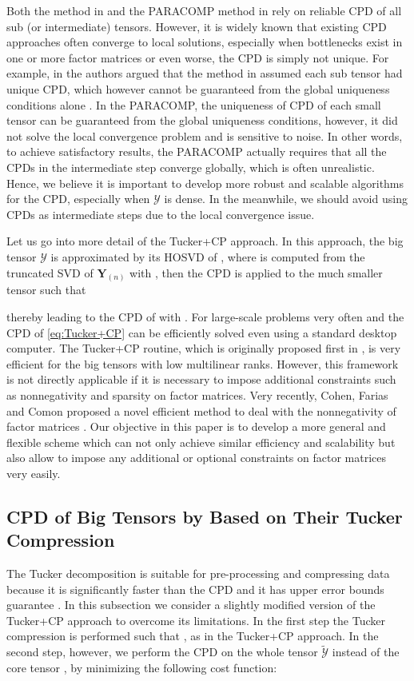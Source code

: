 \documentclass[10pt,twocolumn,twoside]{IEEEtran}
\newcommand{\tensor}[1]{\ensuremath{\boldsymbol{\mathscr{#1}}}}
\newcommand{\tenmat}[2][n]{\ensuremath{{\mathbf{#2}}_{(#1)}}}
\begin{document}
Both the method in \cite{gridPARAFAC} and the PARACOMP method in \cite{spm2014_paracomp} rely on reliable CPD of all sub (or intermediate) tensors. However, it is widely known that existing CPD approaches often converge to local solutions, especially when bottlenecks exist in one or more factor matrices \cite{PComon2009} or even worse,  the CPD is simply not unique.  For example, in \cite{spm2014_paracomp} the authors argued that the method in  \cite{gridPARAFAC} assumed each sub tensor had unique CPD, which however cannot be guaranteed from the global uniqueness conditions alone \cite{spm2014_paracomp}. In the PARACOMP,  the uniqueness of CPD of each small tensor can be guaranteed from the global uniqueness conditions, however, it did not solve the local convergence problem and is sensitive to noise.  In other words, to achieve satisfactory results, the PARACOMP actually requires that all the CPDs in the intermediate step  converge globally, which is often unrealistic. Hence, we believe it is  important to develop more robust and scalable algorithms for the CPD, especially when \tensor{Y} is dense. In the meanwhile, we should avoid using CPDs as intermediate steps due to the local convergence issue.


Let us go into more detail of the Tucker+CP approach. In this approach, the big tensor \tensor{Y} is approximated by its HOSVD of , where  is computed from the truncated SVD of \tenmat{Y} with , then the CPD is applied to the much smaller tensor   such that

thereby leading to the CPD of  with .
For large-scale problems very often  and the CPD of \eqref{eq:Tucker+CP} can be efficiently solved even using a standard desktop computer. 
The Tucker+CP routine, which is originally proposed first  in \cite{BroTuckerPD}, is very efficient for the big tensors with low multilinear ranks. However, this framework is not directly applicable if  it is necessary  to impose additional constraints such as nonnegativity and sparsity on factor matrices. Very recently, Cohen, Farias and Comon proposed a novel efficient method to deal with the nonnegativity of factor matrices \cite{ComonNTF}. Our objective in this paper is to develop a more general and flexible scheme which can  not only achieve similar efficiency and scalability but also allow  to  impose  any  additional or optional constraints on factor matrices very easily.
 
\subsection{CPD of Big Tensors by Based on Their Tucker Compression}
The Tucker decomposition is suitable for pre-processing and compressing data because it is  significantly faster than the CPD and it has upper error bounds guarantee \cite{HOSVD2000}. In this subsection we consider a slightly modified version of the Tucker+CP approach to overcome its limitations. In the first step the Tucker compression is performed such that , as in the Tucker+CP approach. In the second step, however, we perform the CPD on the whole tensor \tensor{\tilde{Y}} instead of the core tensor , by minimizing the following cost function:
\end{document}
